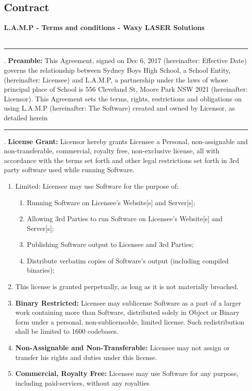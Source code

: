 \documentclass[oneside,openany,11pt,a4paper]{report}
\begin{document}
\subsection{Contract}
\begin{center}\Large\textbf{L.A.M.P - Terms and conditions - Waxy LASER Solutions}\\ \ \end{center}
\rule{\textwidth}{2pt}

\flushleft
\small
{}. \textbf{Preamble:} This Agreement, signed on Dec 6, 2017 (hereinafter: Effective Date) governs the relationship between Sydney Boys High School, a School Entity, (hereinafter: Licensee) and L.A.M.P, a partnership under the laws of whose principal place of School is 556 Cleveland St, Moore Park NSW 2021 (hereinafter: Licensor). This Agreement sets the terms, rights, restrictions and obligations on using L.A.M.P (hereinafter: The Software) created and owned by Licensor, as detailed herein

\noindent\rule{\textwidth}{0.5pt}
. \textbf{License Grant:} Licensor hereby grants Licensee a Personal, non-assignable and non-transferable, commercial, royalty free, non-exclusive license, all with accordance with the terms set forth and other legal restrictions set forth in 3rd party software used while running Software.


\begin{enumerate}
	\item Limited: Licensee may use Software for the purpose of: \begin{enumerate}
		\item Running Software on Licensee’s Website[s] and Server[s]; 
		\item Allowing 3rd Parties to run Software on Licensee’s Website[s] and Server[s]; 
		\item Publishing Software output to Licensee and 3rd Parties; 
		\item Distribute verbatim copies of Software’s output (including compiled binaries);
	\end{enumerate}
\item This license is granted perpetually, as long as it is not materially breached.
\item \textbf{Binary Restricted:} Licensee may sublicense Software as a part of a larger work containing more than Software, distributed solely in Object or Binary form under a personal, non-sublicensable, limited license. Such redistribution shall be limited to 1600 codebases.
\item \textbf{Non-Assignable and Non-Transferable:} Licensee may not assign or transfer his rights and duties under this license.
\item \textbf{Commercial, Royalty Free:} Licensee may use Software for any purpose, including paid-services, without any royalties

\end{enumerate}
\end{document}
